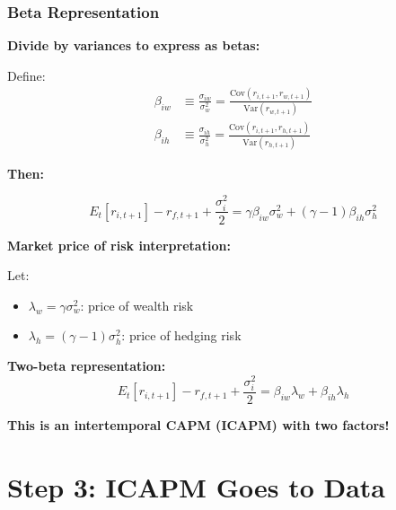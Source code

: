 \documentclass{beamer}
\begin{document}
\begin{frame}[allowframebreaks]
    \frametitle{Beta Representation}
    
    \textbf{Divide by variances to express as betas:}
    
    Define:
    \begin{align*}
        \beta_{iw} &\equiv \frac{\sigma_{iw}}{\sigma_w^2} = \frac{\text{Cov}(r_{i,t+1}, r_{w,t+1})}{\text{Var}(r_{w,t+1})}\\
        \beta_{ih} &\equiv \frac{\sigma_{ih}}{\sigma_h^2} = \frac{\text{Cov}(r_{i,t+1}, r_{h,t+1})}{\text{Var}(r_{h,t+1})}
    \end{align*}
    
    \textbf{Then:}
    \begin{tcolorbox}[colback=green!5!white, colframe=green!75!black]
    \begin{equation*}
        E_t[r_{i,t+1}] - r_{f,t+1} + \frac{\sigma_i^2}{2} = \gamma \beta_{iw} \sigma_w^2 + (\gamma-1)\beta_{ih}\sigma_h^2
    \end{equation*}
    \end{tcolorbox}
    
    \framebreak
    
    \textbf{Market price of risk interpretation:}
    
    Let:
    \begin{itemize}
        \item $\lambda_w = \gamma \sigma_w^2$: price of wealth risk
        \item $\lambda_h = (\gamma-1)\sigma_h^2$: price of hedging risk
    \end{itemize}
    
    \textbf{Two-beta representation:}
    \begin{equation*}
        E_t[r_{i,t+1}] - r_{f,t+1} + \frac{\sigma_i^2}{2} = \beta_{iw}\lambda_w + \beta_{ih}\lambda_h
    \end{equation*}
    
    \textbf{This is an intertemporal CAPM (ICAPM) with two factors!}
\end{frame}

\section{Step 3: ICAPM Goes to Data}
\end{document}
